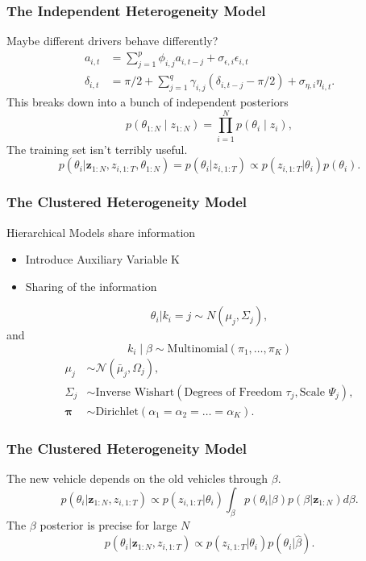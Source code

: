 \documentclass[11pt]{beamer}\usepackage[]{graphicx}\usepackage[]{color}
\begin{document}
\begin{frame}
\frametitle{The Independent Heterogeneity Model}
Maybe different drivers behave differently?
\begin{align}
a_{i, t} &= \sum_{j = 1}^p \phi_{i, j} a_{i, t-j} + \sigma_{\epsilon, i} \epsilon_{i, t} \label{aAR2} \\
\delta_{i, t} &= \pi/2 + \sum_{j = 1}^q \gamma_{i, j} (\delta_{i, t-j} - \pi/2) + \sigma_{\eta, i} \eta_{i, t}. \label{dAR2}
\end{align}
This breaks down into a bunch of independent posteriors
\begin{equation}
p(\theta_{1:N} \mid z_{1:N}) = \prod_{i=1}^N p(\theta_{i} \mid z_{i}),
\end{equation}
The training set isn't terribly useful.
\begin{equation}
p(\theta_{i}| \textbf{z}_{1:N}, z_{i,1:T}, \theta_{1:N}) = p(\theta_{i} | z_{i, 1:T}) \propto p(z_{i, 1:T} | \theta_i) p(\theta_i).
\label{indepNewCar}
\end{equation}
\end{frame}

\begin{frame}
\frametitle{The Clustered Heterogeneity Model}
Hierarchical Models share information 
\begin{itemize}
\item Introduce Auxiliary Variable K
\item Sharing of the information
\end{itemize}
\begin{equation}
\label{mixPrior}
\theta_i | k_i = j \sim N(\mu_j, \Sigma_j),
\end{equation}
and
\begin{equation}
k_i \mid \beta \sim \mbox{Multinomial}\left(\pi_1, \dots, \pi_{K}\right)
\end{equation}
\begin{align}
\mu_j &\sim \mathcal{N}\left(\bar{\mu}_j, \Omega_j\right), \\
\Sigma_j &\sim \mbox{Inverse Wishart}\left(\mbox{Degrees of Freedom } \tau_j, \mbox{Scale } \Psi_j\right), \\
\boldsymbol{\pi} &\sim \mbox{Dirichlet}\left(\alpha_1 = \alpha_2 = \dots = \alpha_K\right).
\end{align}
\end{frame}

\begin{frame}
\frametitle{The Clustered Heterogeneity Model}
The new vehicle depends on the old vehicles through $\beta$.
\begin{equation}
\label{hierNewCar}
p(\theta_{i} | \textbf{z}_{1:N}, z_{i, 1:T}) \propto p(z_{i, 1:T} | \theta_{i}) \int_{\beta} p(\theta_{i} | \beta) p (\beta | \textbf{z}_{1:N}) d\beta.
\end{equation}
The $\beta$ posterior is precise for large $N$
\begin{equation}
\label{hierNewCar2}
p(\theta_{i} | \textbf{z}_{1:N}, z_{i, 1:T}) \propto p(z_{i, 1:T} | \theta_{i}) p(\theta_{i} | \hat{\beta}).
\end{equation}
\end{frame}
\end{document}
